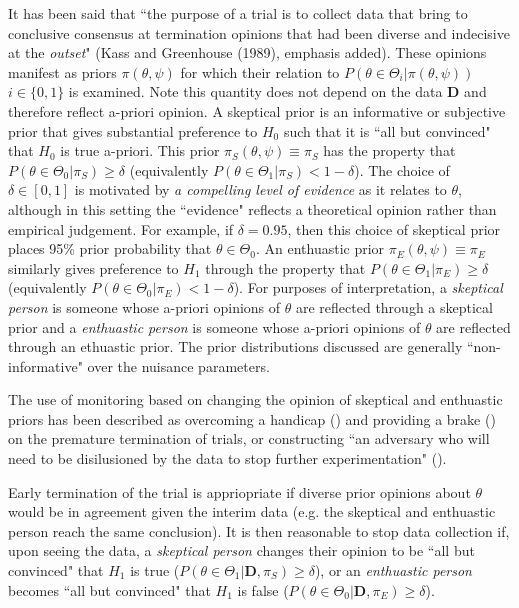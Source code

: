 \documentclass[12pt]{article}
\begin{document}
It has been said that ``the purpose of a trial is to collect data that bring to conclusive consensus at termination opinions that had been diverse and indecisive at the \textit{outset}" (Kass and Greenhouse (1989), emphasis added). These opinions manifest as priors $\pi(\theta,\psi)$ for which their relation to $P(\theta\in\Theta_i|\pi(\theta,\psi))$ $i\in\{0,1\}$ is examined. Note this quantity does not depend on the data $\mathbf{D}$ and therefore reflect a-priori opinion. A skeptical prior is an informative or subjective prior that gives substantial preference to $H_0$ such that it is ``all but convinced" that $H_0$ is true a-priori. This prior $\pi_{S}(\theta,\psi)\equiv\pi_{S}$ has the property that $P(\theta\in\Theta_0| \pi_{S})\geq\delta$ (equivalently $P(\theta\in\Theta_1| \pi_{S})<1-\delta$). The choice of $\delta\in[0,1]$ is motivated by \textit{a compelling level of evidence} as it relates to $\theta$, although in this setting the ``evidence" reflects a theoretical opinion rather than empirical judgement. For example, if $\delta=0.95$, then this choice of skeptical prior places 95\% prior probability that $\theta\in\Theta_0$. An enthuastic prior $\pi_{E}(\theta,\psi)\equiv\pi_{E}$ similarly gives preference to $H_1$ through the property that $P(\theta\in\Theta_1| \pi_{E})\geq\delta$ (equivalently $P(\theta\in\Theta_0| \pi_{E})<1-\delta$). For purposes of interpretation, a \textit{skeptical person} is someone whose a-priori opinions of $\theta$ are reflected through a skeptical prior and a \textit{enthuastic person} is someone whose a-priori opinions of $\theta$ are reflected through an ethuastic prior. The prior distributions discussed are generally ``non-informative" over the nuisance parameters.

The use of monitoring based on changing the opinion of skeptical and enthuastic priors has been described as overcoming a handicap (\cite{Freedman1989}) and providing a brake (\cite{Fayers1997}) on the premature termination of trials, or constructing ``an adversary who will need to be disilusioned by the data to stop further experimentation" (\cite{Spiegelhalter1994}). 

Early termination of the trial is appriopriate if diverse prior opinions about $\theta$ would be in agreement given the interim data (e.g. the skeptical and enthuastic person reach the same conclusion). It is then reasonable to stop data collection if, upon seeing the data, a \textit{skeptical person} changes their opinion to be ``all but convinced" that $H_1$ is true ($P(\theta\in\Theta_1|\mathbf{D}, \pi_{S})\geq\delta$), or an \textit{enthuastic person} becomes ``all but convinced" that $H_1$ is false ($P(\theta\in\Theta_0|\mathbf{D}, \pi_{E})\geq\delta$).
\end{document}
